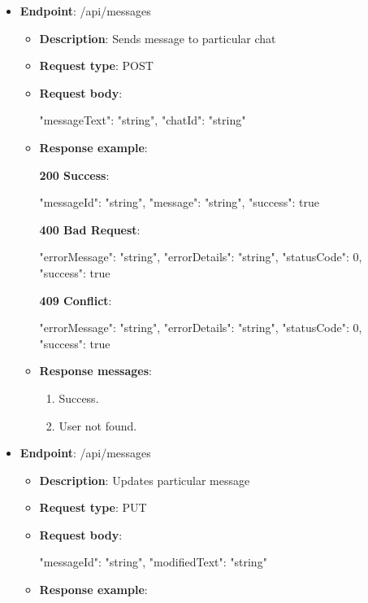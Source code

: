 \begin{itemize}
    \item \textbf{Endpoint}: /api/messages
    \begin{itemize}
        \item \textbf{Description}: Sends message to particular chat
        \item \textbf{Request type}: POST
        \item \textbf{Request body}:
        \begin{spverbatim}
        {
            "messageText": "string",
            "chatId": "string"
        }
        \end{spverbatim}

        \item \textbf{Response example}:

        \textbf{200 Success}:

        \begin{spverbatim}
        {
            "messageId": "string",
            "message": "string",
            "success": true
        }
        \end{spverbatim}

        \textbf{400 Bad Request}:

        \begin{spverbatim}
        {
            "errorMessage": "string",
            "errorDetails": "string",
            "statusCode": 0,
            "success": true
        }
        \end{spverbatim}

        \textbf{409 Conflict}:

        \begin{spverbatim}
        {
            "errorMessage": "string",
            "errorDetails": "string",
            "statusCode": 0,
            "success": true
        }
        \end{spverbatim}

        \item \textbf{Response messages}:
        \begin{enumerate}
            \item Success.
            \item User not found.
        \end{enumerate}
    \end{itemize}

    \item \textbf{Endpoint}: /api/messages
    \begin{itemize}
        \item \textbf{Description}: Updates particular message
        \item \textbf{Request type}: PUT
        \item \textbf{Request body}:
        \begin{spverbatim}
        {
            "messageId": "string",
            "modifiedText": "string"
        }
        \end{spverbatim}
        \item \textbf{Response example}:


\end{itemize}
\end{itemize}
